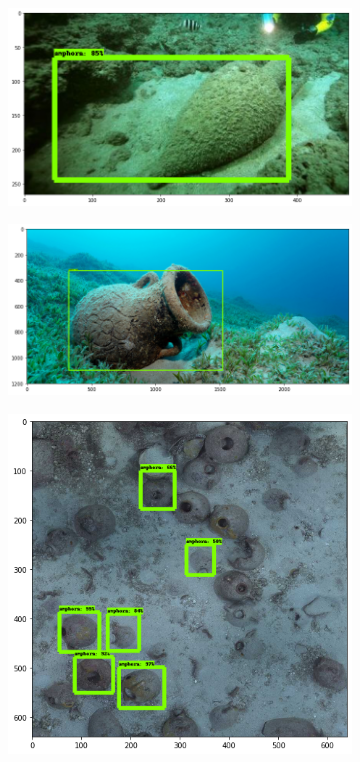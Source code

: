 \documentclass[a4paper, 11pt, oneside]{article}
\begin{document}
\begin{figure}[ht]
  \bigskip
  \begin{subfigure}[ht]{0.4\textwidth}
    \centering
    \includegraphics[width=\textwidth]{val_5.png}
  \end{subfigure}
  \begin{subfigure}[ht]{0.4\textwidth}
    \centering
    \includegraphics[width=\textwidth]{val_7.png}
  \end{subfigure}
  \bigskip
  \begin{subfigure}[ht]{0.4\textwidth}
    \centering
    \includegraphics[width=\textwidth]{val_4.png}

\end{subfigure}
\end{figure}
\end{document}
